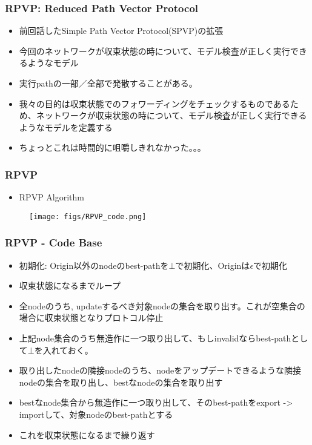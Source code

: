 \documentclass[dvipdfmx,9pt,notheorems]{beamer}
\theoremstyle{definition}
\begin{document}
%
%
\begin{frame}\frametitle{RPVP: Reduced Path Vector Protocol}
\begin{itemize}
	\item 前回話したSimple Path Vector Protocol(SPVP)の拡張
	\item 今回のネットワークが収束状態の時について、モデル検査が正しく実行できるようなモデル
	\item 実行pathの一部／全部で発散することがある。
	\item 我々の目的は収束状態でのフォワーディングをチェックするものであるため、ネットワークが収束状態の時について、モデル検査が正しく実行できるようなモデルを定義する
	\item ちょっとこれは時間的に咀嚼しきれなかった。。。
\end{itemize}
\pnote{
}
\end{frame}

\begin{frame}\frametitle{RPVP}
\begin{itemize}
	\item RPVP Algorithm
\end{itemize}
  \begin{figure}[htb]
    \centering
		\texttt{[image: figs/RPVP\_code.png]}
  \end{figure}%
\pnote{
}
\end{frame}


\begin{frame}\frametitle{RPVP - Code Base}
\begin{itemize}
	\item 初期化: Origin以外のnodeのbest-pathを$\bot$で初期化、Originは$\epsilon$で初期化
	\item 収束状態になるまでループ
	\item 全nodeのうち, updateするべき対象nodeの集合を取り出す。これが空集合の場合に収束状態となりプロトコル停止
	\item 上記node集合のうち無造作に一つ取り出して、もしinvalidならbest-pathとして$\bot$を入れておく。
	\item 取り出したnodeの隣接nodeのうち、nodeをアップデートできるような隣接nodeの集合を取り出し、bestなnodeの集合を取り出す
	\item bestなnode集合から無造作に一つ取り出して、そのbest-pathをexport -> importして、対象nodeのbest-pathとする
	\item これを収束状態になるまで繰り返す
\end{itemize}
\pnote{
}
\end{frame}
\end{document}
